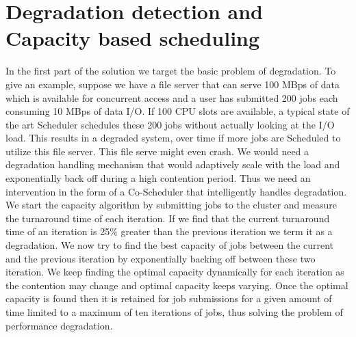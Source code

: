 \documentclass[ms,electronic,double]{nuthesis}
\begin{document}
\section{Degradation detection and Capacity based scheduling}
In the first part of the solution we target the basic problem of degradation. To give an example, suppose
we have a file server that can serve 100 MBps of data which is available for concurrent access and a user has submitted 200 jobs
each consuming 10 MBps of data I/O. If 100 CPU slots are available, a typical state of the art Scheduler
schedules these 200 jobs without actually looking at the I/O load. This results in a degraded system, 
over time if more jobs are Scheduled to utilize this file server. This file serve might even crash. We would need a 
degradation handling mechanism that would adaptively scale with the load and  exponentially 
back off during a high contention period. Thus we need an intervention in the form
of a Co-Scheduler that intelligently handles degradation. 
We start the capacity algorithm by submitting jobs to the cluster and measure 
the turnaround time of each iteration. If we find that the current turnaround 
time of an iteration is 25\% greater than the previous iteration we term it as a 
degradation. We now try to find the best capacity of jobs between the current 
and the previous iteration by exponentially backing off between these two iteration. We keep finding the optimal
capacity dynamically for each iteration as the contention may change and optimal capacity keeps 
 varying. Once the optimal capacity is found then it is retained for job submissions for a given amount of time
 limited to a maximum of ten iterations of jobs, thus solving the problem of performance degradation. 
\end{document}
